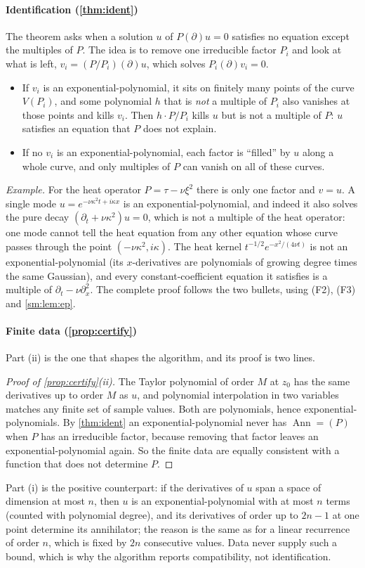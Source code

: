 \documentclass[11pt]{article}
\theoremstyle{plain}
\theoremstyle{definition}
\theoremstyle{remark}
\DeclareMathOperator{\Ann}{Ann}             %
\newcommand{\Var}{V}                        %
\begin{document}
\paragraph{Identification (\cref{thm:ident})} The theorem asks when a solution $u$ of $P(\partial)u=0$ satisfies no
equation except the multiples of $P$. The idea is to remove one irreducible factor $P_i$ and look at what is left,
$v_i=(P/P_i)(\partial)u$, which solves $P_i(\partial)v_i=0$.
\begin{itemize}
\item If $v_i$ is an exponential-polynomial, it sits on finitely many points of the curve $\Var(P_i)$, and some polynomial
$h$ that is \emph{not} a multiple of $P_i$ also vanishes at those points and kills $v_i$. Then $h\cdot P/P_i$ kills $u$ but
is not a multiple of $P$: $u$ satisfies an equation that $P$ does not explain.
\item If no $v_i$ is an exponential-polynomial, each factor is ``filled'' by $u$ along a whole curve, and only multiples of
$P$ can vanish on all of these curves.
\end{itemize}
\emph{Example.} For the heat operator $P=\tau-\nu\xi^2$ there is only one factor and $v=u$. A single mode
$u=e^{-\nu\kappa^2t+i\kappa x}$ is an exponential-polynomial, and indeed it also solves the pure decay
$(\partial_t+\nu\kappa^2)u=0$, which is not a multiple of the heat operator: one mode cannot tell the heat equation from
any other equation whose curve passes through the point $(-\nu\kappa^2,i\kappa)$. The heat kernel
$t^{-1/2}e^{-x^2/(4\nu t)}$ is not an exponential-polynomial (its $x$-derivatives are polynomials of growing degree times
the same Gaussian), and every constant-coefficient equation it satisfies is a multiple of $\partial_t-\nu\partial_x^2$.
The complete proof follows the two bullets, using (F2), (F3) and \cref{sm:lem:ep}.

\paragraph{Finite data (\cref{prop:certify})} Part (ii) is the one that shapes the algorithm, and its proof is two lines.
\begin{proof}[Proof of \cref{prop:certify}(ii)]
The Taylor polynomial of order $M$ at $z_0$ has the same derivatives up to order $M$ as $u$, and polynomial interpolation
in two variables matches any finite set of sample values. Both are polynomials, hence exponential-polynomials. By
\cref{thm:ident} an exponential-polynomial never has $\Ann=(P)$ when $P$ has an irreducible factor, because removing that
factor leaves an exponential-polynomial again. So the finite data are equally consistent with a function that does not
determine $P$.
\end{proof}
Part (i) is the positive counterpart: if the derivatives of $u$ span a space of dimension at most $n$, then $u$ is an
exponential-polynomial with at most $n$ terms (counted with polynomial degree), and its derivatives of order up to $2n-1$
at one point determine its annihilator; the reason is the same as for a linear recurrence of order $n$, which is fixed by
$2n$ consecutive values. Data never supply such a bound, which is why the algorithm reports compatibility, not
identification.
\end{document}

